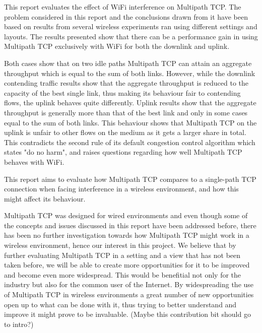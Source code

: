 This report evaluates the effect of WiFi interference on Multipath TCP. The 
problem considered in this report and the conclusions drawn from it have been 
based on results from several wireless experiments ran using different settings 
and layouts. The results presented show that there can be a performance gain 
in using Multipath TCP exclusively with WiFi for both the downlink and uplink.

Both cases show that on two idle paths Multipath TCP can attain an aggregate
throughput which is equal to the sum of both links. However, while the downlink 
contending traffic results show that the aggregate throughput is reduced to the 
capacity of the best single link, thus making its behaviour fair to contending 
flows, the uplink behaves quite differently.
Uplink results show that the aggregate throughput is generally more than that of 
the best link and only in some cases equal to the sum of both links. This 
behaviour shows that Multipath TCP on the uplink is unfair to other flows on the 
medium as it gets a larger share in total. This contradicts the second rule of 
its default congestion control algorithm which states "do no harm", and raises 
questions regarding how well Multipath TCP behaves with WiFi.

This report aims to evaluate how Multipath TCP compares to a single-path TCP 
connection when facing interference in a wireless environment, and how this 
might affect its behaviour.

Multipath TCP was designed for wired environments and even though some of the 
concepts and issues discussed in this report have been addressed before, there 
has been no further investigation towards how Multipath TCP might work in a 
wireless environment, hence our interest in this project. We believe that by 
further evaluating Multipath TCP in a setting and a view that has not been taken 
before, we will be able to create more opportunities for it to be improved and 
become even more widespread. This would be benefitial not only for the industry 
but also for the common user of the Internet. By widespreading the use of 
Multipath TCP in wireless environments a great number of new opportunities open 
up to what can be done with it, thus trying to better understand and improve it 
might prove to be invaluable. (Maybe this contribution bit should go to intro?)


